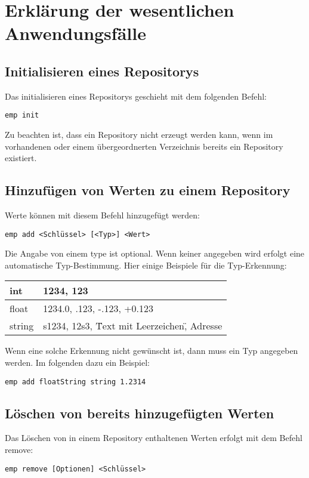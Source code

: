 
\section{Erklärung der wesentlichen Anwendungsfälle}

\subsection{Initialisieren eines Repositorys}
Das initialisieren eines Repositorys geschieht mit dem folgenden Befehl:
\begin{verbatim}
emp init
\end{verbatim}
Zu beachten ist, dass ein Repository nicht erzeugt werden kann, wenn im vorhandenen oder einem übergeordnerten Verzeichnis bereits ein Repository existiert.

\subsection{Hinzufügen von Werten zu einem Repository}
Werte können mit diesem Befehl hinzugefügt werden:
\begin{verbatim}
emp add <Schlüssel> [<Typ>] <Wert>
\end{verbatim}
Die Angabe von einem type ist optional. Wenn keiner angegeben wird erfolgt eine automatische Typ-Bestimmung.
Hier einige Beispiele für die Typ-Erkennung:

\begin{tabular}{| l | l |}
	\hline
	int & 1234, 123 \\
	\hline
	float & 1234.0, .123, -.123, +0.123 \\
	\hline
	string & s1234, 12s3, \"Text mit Leerzeichen\", Adresse \\
	\hline
\end{tabular} 

Wenn eine solche Erkennung nicht gewünscht ist, dann muss ein Typ angegeben werden. Im folgenden dazu ein Beispiel:
\begin{verbatim}
emp add floatString string 1.2314
\end{verbatim}

\subsection{Löschen von bereits hinzugefügten Werten}
Das Löschen von in einem Repository enthaltenen Werten erfolgt mit dem Befehl remove:
\begin{verbatim}
emp remove [Optionen] <Schlüssel>
\end{verbatim}

